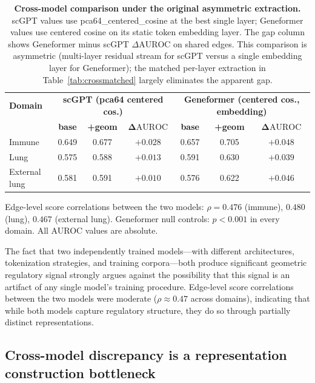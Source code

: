 \documentclass[11pt]{article}
\newcommand{\DAURC}{\Delta\mathrm{AUROC}}
\begin{document}
\begin{table}[t]
\centering
\caption{\textbf{Cross-model comparison under the original asymmetric extraction.}
scGPT values use pca64\_centered\_cosine at the best single layer; Geneformer values use centered cosine on its static token embedding layer.
The gap column shows Geneformer minus scGPT $\DAURC$ on shared edges.
This comparison is asymmetric (multi-layer residual stream for scGPT versus a single embedding layer for Geneformer); the matched per-layer extraction in Table~\ref{tab:crossmatched} largely eliminates the apparent gap.}
\label{tab:geneformer}
\small
\begin{tabular}{lcccccc}
\toprule
\textbf{Domain} & \multicolumn{3}{c}{\textbf{scGPT (pca64 centered cos.)}} & \multicolumn{3}{c}{\textbf{Geneformer (centered cos., embedding)}} \\
 & \textbf{base} & \textbf{+geom} & $\boldsymbol{\DAURC}$ & \textbf{base} & \textbf{+geom} & $\boldsymbol{\DAURC}$ \\
\midrule
Immune        & 0.649 & 0.677 & $+0.028$ & 0.657 & 0.705 & $+0.048$ \\
Lung          & 0.575 & 0.588 & $+0.013$ & 0.591 & 0.630 & $+0.039$ \\
External lung & 0.581 & 0.591 & $+0.010$ & 0.576 & 0.622 & $+0.046$ \\
\bottomrule
\end{tabular}
\par\smallskip
\footnotesize Edge-level score correlations between the two models: $\rho = 0.476$ (immune), $0.480$ (lung), $0.467$ (external lung). Geneformer null controls: $p < 0.001$ in every domain. All AUROC values are absolute.
\end{table}

The fact that two independently trained models---with different architectures, tokenization strategies, and training corpora---both produce significant geometric regulatory signal strongly argues against the possibility that this signal is an artifact of any single model's training procedure.
Edge-level score correlations between the two models were moderate ($\rho \approx 0.47$ across domains), indicating that while both models capture regulatory structure, they do so through partially distinct representations.

\subsection*{Cross-model discrepancy is a representation construction bottleneck}
\end{document}

